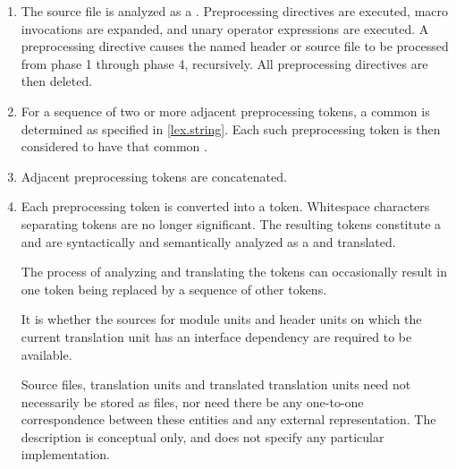 \begin{enumerate}
\item The source file is analyzed as a .
Preprocessing directives are executed, macro invocations are
expanded, and  unary operator expressions are executed.
A  preprocessing directive causes the named header or
source file to be processed from phase 1 through phase 4, recursively.
All preprocessing directives are then deleted.

\item
For a sequence of two or more adjacent  preprocessing tokens,
a common  is determined
as specified in \ref{lex.string}.
Each such  preprocessing token is then considered to have
that common .

\item
Adjacent  preprocessing tokens are concatenated.

\item
Each preprocessing token is converted into a token.
Whitespace characters separating tokens are no longer significant.
The resulting tokens constitute a  and
are syntactically and
semantically analyzed as a  and
translated.
\begin{note}
The process of analyzing and translating the tokens can occasionally
result in one token being replaced by a sequence of other
tokens.
\end{note}
It is
whether the sources for
module units and header units
on which the current translation unit has an interface
dependency
are required to be available.
\begin{note}
Source files, translation
units and translated translation units need not necessarily be stored as
files, nor need there be any one-to-one correspondence between these
entities and any external representation. The description is conceptual
only, and does not specify any particular implementation.
\end{note}


\end{enumerate}
